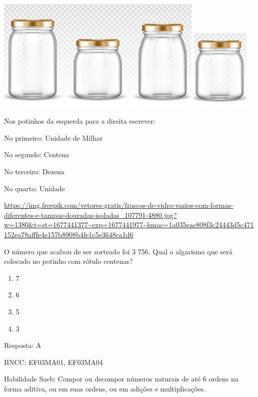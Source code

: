 \includegraphics[width=3.90833in,height=2.14168in]{media/image129.png}
\includegraphics[width=1.10010in,height=1.54180in]{media/image130.png}

Nos potinhos da esquerda para a direita escrever:

No primeiro: Unidade de Milhar

No segundo: Centena

No terceiro: Dezena

No quarto: Unidade

\url{https://img.freepik.com/vetores-gratis/frascos-de-vidro-vazios-com-formas-diferentes-e-tampas-douradas-isoladas_107791-4880.jpg?w=1380\&t=st=1677441377~exp=1677441977~hmac=1a035eae808f3c24443d5c471152ea78afffe4e157b8908b4fe1c5e3648ca1d6}

O número que acabou de ser sorteado foi 3 756. Qual o algarismo que será
colocado no potinho com rótulo centenas?

\begin{enumerate}
\def\labelenumi{\alph{enumi})}
\item
  7
\item
  6
\item
  5
\item
  3
\end{enumerate}

Resposta: A

BNCC: EF03MA01, EF03MA04

Habilidade Saeb: Compor ou decompor números naturais de até 6 ordens na
forma aditiva, ou em suas ordens, ou em adições e multiplicações.

